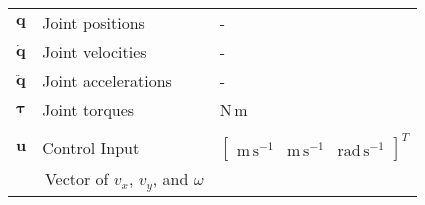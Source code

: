 \begin{table}[h!]
\begin{tabular}{lll}
    $\mathbf q$ & Joint positions & - \\
    $\mathbf{\dot q}$ & Joint velocities & - \\
    $\mathbf{\ddot q}$ & Joint accelerations & - \\
    $\mathbf \tau$ & Joint torques & N\,m \\
    & & \\

    $\mathbf u$ & Control Input & $
    \begin{bmatrix}
      \text{m}\,\text{s}^{-1} & \text{m}\,\text{s}^{-1} &
      \text{rad}\,\text{s}^{-1}
    \end{bmatrix}^T$ \\
    & \,\footnotesize{Vector of $v_x$, $v_y$, and $\omega$} & \\
  \end{tabular}
\end{table}
